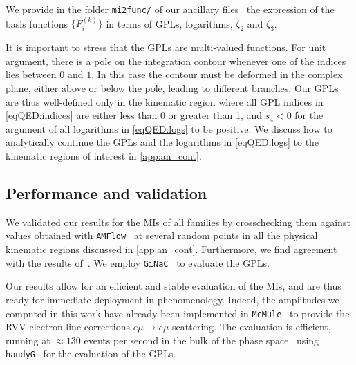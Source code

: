 \documentclass[main.tex]{subfiles}
\begin{document}
We provide in the folder \texttt{mi2func/} of our ancillary files~\cite{zenodo} the expression of the basis functions $\{F^{(k)}_i\}$ in terms of GPLs, logarithms, $\zeta_2$ and $\zeta_3$.

\smallskip

It is important to stress that the GPLs are multi-valued functions.
For unit argument, there is a pole on the integration contour whenever one of the indices lies between $0$ and $1$. In this case the contour must be deformed in the complex plane, either above or below the pole, leading to different branches. Our GPLs are thus well-defined only in the 
kinematic region where all GPL indices in \cref{eqQED:indices} are either less than 0 or greater than 1, and $s_4 < 0$ for the argument of all logarithms in \cref{eqQED:logs} to be positive. We discuss how to analytically continue the GPLs and the logarithms in \cref{eqQED:logs} to the kinematic regions of interest in \cref{app:an_cont}.



\subsection{Performance and validation}
\label{secQED:performance}

We validated our results for the MIs of all families by crosschecking them against values obtained with \texttt{AMFlow}~\cite{Liu:2022chg} at several random points in all the physical kinematic regions discussed in \cref{app:an_cont}. Furthermore, we find agreement with the results of~. We employ \texttt{GiNaC}~\cite{Bauer:2000cp,Vollinga:2004sn} to evaluate the GPLs.

Our results allow for an efficient and stable evaluation of the MIs, and are thus ready for immediate deployment in phenomenology. Indeed, the amplitudes we computed in this work have already been implemented in \texttt{McMule}~\cite{Banerjee:2020rww,ulrich_yannick_2022_6046769} to provide the \acl{RVV} electron-line corrections  $e \mu \to e \mu$ scattering. The evaluation is efficient, running at $\approx 130$ events per second in the bulk of the phase space~\cite{ulrich-radcor} using \texttt{handyG}~\cite{Naterop:2019xaf} for the evaluation of the GPLs.
\end{document}
